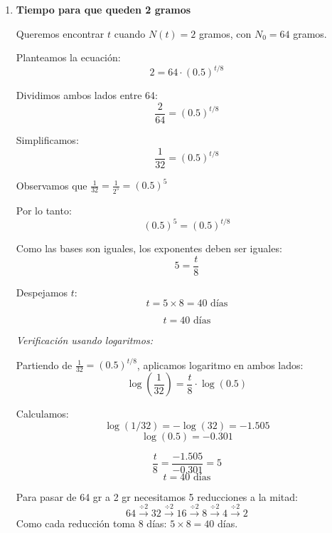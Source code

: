 \documentclass[12pt]{article}
\begin{document}
\begin{enumerate}[label=\alph*.-]
\begin{enumerate}[label=\roman*.]
        Comparando con nuestra fórmula $N = N_0(0.5)^{t/8}$:
        
        \[\boxed{\text{La vida media es } h = 8 \text{ días}}\]
        
        \textit{Verificación:} Si $t = 8$ días:
        \[N(8) = N_0(0.5)^{8/8} = N_0(0.5)^1 = 0.5N_0\]
        Efectivamente, se reduce a la mitad. \checkmark
        
        \item \textbf{Tiempo para que queden 2 gramos}
        
        Queremos encontrar $t$ cuando $N(t) = 2$ gramos, con $N_0 = 64$ gramos.
        
        Planteamos la ecuación:
        \[2 = 64 \cdot (0.5)^{t/8}\]
        
        Dividimos ambos lados entre 64:
        \[\frac{2}{64} = (0.5)^{t/8}\]
        
        Simplificamos:
        \[\frac{1}{32} = (0.5)^{t/8}\]
        
        Observamos que $\frac{1}{32} = \frac{1}{2^5} = (0.5)^5$
        
        Por lo tanto:
        \[(0.5)^5 = (0.5)^{t/8}\]
        
        Como las bases son iguales, los exponentes deben ser iguales:
        \[5 = \frac{t}{8}\]
        
        Despejamos $t$:
        \[t = 5 \times 8 = 40 \text{ días}\]
        
        \[\boxed{t = 40 \text{ días}}\]
        
        \textit{Verificación usando logaritmos:}
        
        Partiendo de $\frac{1}{32} = (0.5)^{t/8}$, aplicamos logaritmo en ambos lados:
        \[\log\left(\frac{1}{32}\right) = \frac{t}{8} \cdot \log(0.5)\]
        
        Calculamos:
        \[\log(1/32) = -\log(32) = -1.505\]
        \[\log(0.5) = -0.301\]
        
        \[\frac{t}{8} = \frac{-1.505}{-0.301} = 5\]
        \[t = 40 \text{ días}\]
        
        Para pasar de 64 gr a 2 gr necesitamos 5 reducciones a la mitad:
        \[64 \xrightarrow{\div 2} 32 \xrightarrow{\div 2} 16 \xrightarrow{\div 2} 8 \xrightarrow{\div 2} 4 \xrightarrow{\div 2} 2\]
        Como cada reducción toma 8 días: $5 \times 8 = 40$ días.
    \end{enumerate}
    
    \newpage
    

\end{enumerate}
\end{document}
